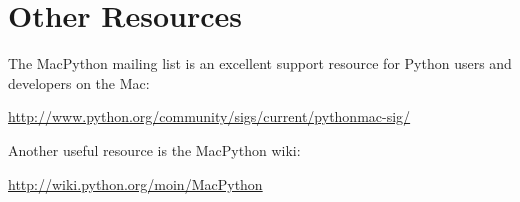 \section{Other Resources}

The MacPython mailing list is an excellent support resource for Python users and
developers on the Mac:

\url{http://www.python.org/community/sigs/current/pythonmac-sig/}

Another useful resource is the MacPython wiki:

\url{http://wiki.python.org/moin/MacPython}
